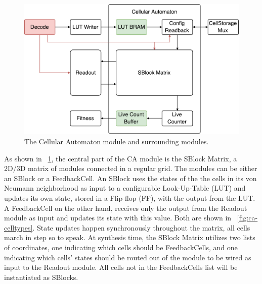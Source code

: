 \begin{figure}[ht]
  \centering
  \includegraphics[width=0.8\linewidth]{fig/ca-io}
  \caption[Cellular Automaton Module]{The Cellular Automaton module and surrounding modules.}
  \label{fig:ca-io}
\end{figure}

As shown in \figurename~\ref{fig:ca-io}, the central part of the CA module is
the SBlock Matrix, a 2D/3D matrix of modules connected in a regular grid. The
modules can be either an SBlock or a FeedbackCell. An SBlock uses the states of
the the cells in its von Neumann neighborhood as input to a configurable
Look-Up-Table (LUT) and updates its own state, stored in a Flip-flop (FF), with
the output from the LUT. A FeedbackCell on the other hand, receives only the
output from the Readout module as input and updates its state with this value.
Both are shown in \figurename~\ref{fig:ca-celltypes}. State updates happen
synchronously throughout the matrix, all cells march in step so to speak. At
synthesis time, the SBlock Matrix utilizes two lists of coordinates, one
indicating which cells should be FeedbackCells, and one indicating which cells'
states should be routed out of the module to be wired as input to the Readout
module. All cells not in the FeedbackCells list will be instantiated as SBlocks.

